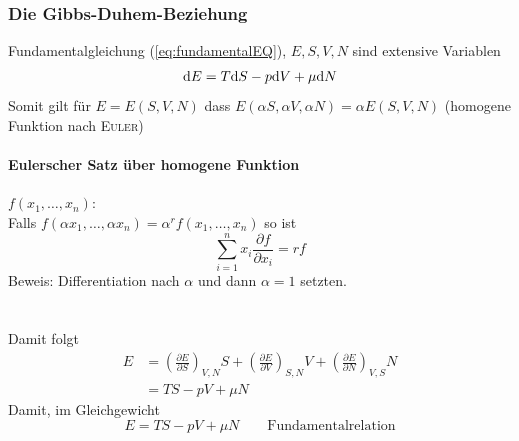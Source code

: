 \subsubsection{Die Gibbs-Duhem-Beziehung}
Fundamentalgleichung (\autoref{eq:fundamentalEQ}), $E, S, V, N$ sind extensive Variablen
\begin{equation}
    \mathrm{d} E = T \mathrm{d} S - p \mathrm{d} V + \mu \mathrm{d} N
\end{equation}
Somit gilt für $E=E(S, V, N)$ dass $E(\alpha S, \alpha V, \alpha N) = \alpha E(S, V, N)$ (homogene Funktion nach \textsc{Euler})
\paragraph{Eulerscher Satz über homogene Funktion} $f(x_1, \ldots, x_n)$: \\
Falls $f(\alpha x_1, \ldots, \alpha x_n) = \alpha^r f(x_1, \ldots, x_n)$ so ist
\begin{equation}
    \sum_{i=1}^{n} x_i \frac{\partial f}{\partial x_i} = r f
\end{equation}
Beweis: Differentiation nach $\alpha$ und dann $\alpha = 1$ setzten.
\paragraph{}\mbox{}\\
Damit folgt
\begin{equation}
    \begin{split}
        E &= \left( \frac{\partial E}{\partial S} \right)_{V, N} S + \left( \frac{\partial E}{\partial V} \right)_{S, N} V + \left( \frac{\partial E}{\partial N} \right)_{V, S} N \\
        &= T S - p V + \mu N
    \end{split}
\end{equation}
Damit, im Gleichgewicht
\begin{equation}
    E = T S - p V + \mu N \qquad \text{Fundamentalrelation}
\end{equation}